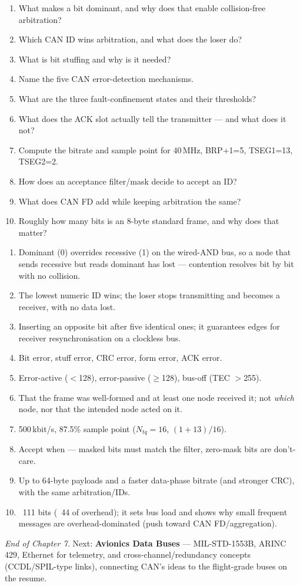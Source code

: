\begin{scorecard}
\begin{enumerate}
\item What makes a bit dominant, and why does that enable collision-free
  arbitration?
\item Which CAN ID wins arbitration, and what does the loser do?
\item What is bit stuffing and why is it needed?
\item Name the five CAN error-detection mechanisms.
\item What are the three fault-confinement states and their thresholds?
\item What does the ACK slot actually tell the transmitter --- and what does it
  not?
\item Compute the bitrate and sample point for 40\,MHz, BRP+1=5, TSEG1=13,
  TSEG2=2.
\item How does an acceptance filter/mask decide to accept an ID?
\item What does CAN FD add while keeping arbitration the same?
\item Roughly how many bits is an 8-byte standard frame, and why does that
  matter?
\end{enumerate}
\end{scorecard}

\begin{answerkey}
\begin{enumerate}
\item Dominant (0) overrides recessive (1) on the wired-AND bus, so a node that
  sends recessive but reads dominant has lost --- contention resolves bit by bit
  with no collision.
\item The lowest numeric ID wins; the loser stops transmitting and becomes a
  receiver, with no data lost.
\item Inserting an opposite bit after five identical ones; it guarantees edges
  for receiver resynchronisation on a clockless bus.
\item Bit error, stuff error, CRC error, form error, ACK error.
\item Error-active ($<$128), error-passive ($\geq$128), bus-off (TEC $>$255).
\item That the frame was well-formed and at least one node received it; not
  \emph{which} node, nor that the intended node acted on it.
\item 500\,kbit/s, 87.5\% sample point ($N_{tq}=16$, $(1+13)/16$).
\item Accept when  --- masked bits must
  match the filter, zero-mask bits are don't-care.
\item Up to 64-byte payloads and a faster data-phase bitrate (and stronger CRC),
  with the same arbitration/IDs.
\item ~111 bits (~44 of overhead); it sets bus load and shows why small frequent
  messages are overhead-dominated (push toward CAN FD/aggregation).
\end{enumerate}
\end{answerkey}

\begin{partnote}
\emph{End of Chapter 7.} Next: \textbf{Avionics Data Buses} ---
MIL-STD-1553B, ARINC 429, Ethernet for telemetry, and cross-channel/redundancy
concepts (CCDL/SPIL-type links), connecting CAN's ideas to the
flight-grade buses on the resume.
\end{partnote}

